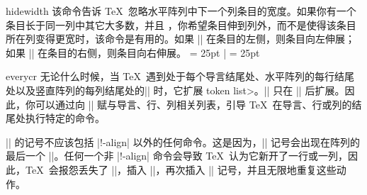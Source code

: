 \begindesc
\cts hidewidth {}
\explain
该命令告诉 \TeX\ 忽略水平阵列中下一个列条目的宽度。如果你有一个条目长于同一列中其它大多数，并且 ，你希望条目伸到列外，而不是使得该条目所在列变得更宽时，该命令是有用的。如果 |\hidewidth| 在条目的左侧，则条目向左伸展；如果 |\hidewidth| 在条目的右侧，则条目向右伸展。
\example
\tabskip = 25pt
|
\produces
\tabskip = 25pt
\endexample
\enddesc

\begindesc
\cts everycr {}
\explain
无论什么时候，当 \TeX\ 遇到处于每个导言结尾处、水平阵列的每行结尾处以及竖直阵列的每列结尾处的|\cr| 时，它扩展 \<token list>。|\everycr| 只在 |\cr| 后扩展。因此，你可以通过向 |\everycr| 赋与导言、行、列相关列表，引导 \TeX\ 在导言、行或列的结尾处执行特定的命令。

|\everycr| 的记号不应该包括 |\no!-align| 以外的任何命令。这是因为，|\everycr| 记号会出现在阵列的最后一个 |\cr|。任何一个非 |\no!-align| 命令会导致 \TeX\ 认为它新开了一行或一列，因此，\TeX\ 会报怨丢失了 |\cr|，插入 |\cr|，再次插入 |\everycr| 记号，并且无限地重复这些动作。

